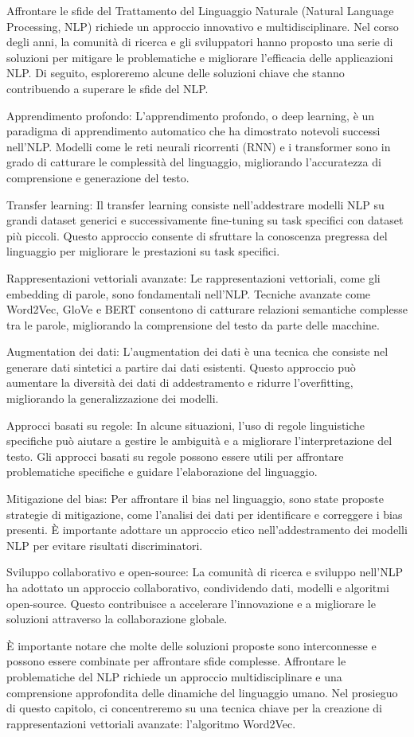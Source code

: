 Affrontare le sfide del Trattamento del Linguaggio Naturale (Natural Language Processing, NLP) richiede un approccio innovativo e multidisciplinare. Nel corso degli anni, la comunità di ricerca e gli sviluppatori hanno proposto una serie di soluzioni per mitigare le problematiche e migliorare l'efficacia delle applicazioni NLP. Di seguito, esploreremo alcune delle soluzioni chiave che stanno contribuendo a superare le sfide del NLP.

Apprendimento profondo: L'apprendimento profondo, o deep learning, è un paradigma di apprendimento automatico che ha dimostrato notevoli successi nell'NLP. Modelli come le reti neurali ricorrenti (RNN) e i transformer sono in grado di catturare le complessità del linguaggio, migliorando l'accuratezza di comprensione e generazione del testo.

Transfer learning: Il transfer learning consiste nell'addestrare modelli NLP su grandi dataset generici e successivamente fine-tuning su task specifici con dataset più piccoli. Questo approccio consente di sfruttare la conoscenza pregressa del linguaggio per migliorare le prestazioni su task specifici.

Rappresentazioni vettoriali avanzate: Le rappresentazioni vettoriali, come gli embedding di parole, sono fondamentali nell'NLP. Tecniche avanzate come Word2Vec, GloVe e BERT consentono di catturare relazioni semantiche complesse tra le parole, migliorando la comprensione del testo da parte delle macchine.

Augmentation dei dati: L'augmentation dei dati è una tecnica che consiste nel generare dati sintetici a partire dai dati esistenti. Questo approccio può aumentare la diversità dei dati di addestramento e ridurre l'overfitting, migliorando la generalizzazione dei modelli.

Approcci basati su regole: In alcune situazioni, l'uso di regole linguistiche specifiche può aiutare a gestire le ambiguità e a migliorare l'interpretazione del testo. Gli approcci basati su regole possono essere utili per affrontare problematiche specifiche e guidare l'elaborazione del linguaggio.

Mitigazione del bias: Per affrontare il bias nel linguaggio, sono state proposte strategie di mitigazione, come l'analisi dei dati per identificare e correggere i bias presenti. È importante adottare un approccio etico nell'addestramento dei modelli NLP per evitare risultati discriminatori.

Sviluppo collaborativo e open-source: La comunità di ricerca e sviluppo nell'NLP ha adottato un approccio collaborativo, condividendo dati, modelli e algoritmi open-source. Questo contribuisce a accelerare l'innovazione e a migliorare le soluzioni attraverso la collaborazione globale.

È importante notare che molte delle soluzioni proposte sono interconnesse e possono essere combinate per affrontare sfide complesse. Affrontare le problematiche del NLP richiede un approccio multidisciplinare e una comprensione approfondita delle dinamiche del linguaggio umano. Nel prosieguo di questo capitolo, ci concentreremo su una tecnica chiave per la creazione di rappresentazioni vettoriali avanzate: l'algoritmo Word2Vec.